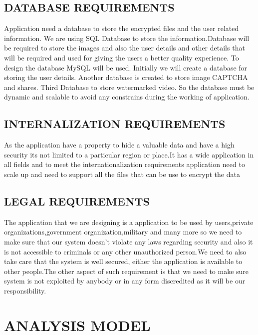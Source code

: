 \documentclass[12pt]{extreport}
\begin{document}
    \subsection{DATABASE REQUIREMENTS}
\hspace*{5em} Application need a database to store the encrypted files and the user related information. We are using SQL Database to store the information.Database will be required to store the images and also the user details and other details that will be required and used for giving the users a better quality experience. To design the database MySQL will be used. Initially we will create a database for storing the user details. Another database is created to store image CAPTCHA and shares. Third Database to store watermarked video. So the database must be dynamic and scalable to avoid any constrains during the working of application.
    \subsection{INTERNALIZATION REQUIREMENTS}
\hspace*{5em}As the application have a property to hide a valuable data and have a high security its not limited to a particular region or place.It has a wide application in all fields and to meet the internationalization requirements application need to scale up and need to support all the files that can be use to encrypt the data
    \subsection{LEGAL REQUIREMENTS}
\hspace*{5em}The application that we are designing is a application to be used by users,private organizations,government organization,military and many more so we need to make sure that our system doesn't violate any laws regarding security and also it is not accessible to criminals or any other unauthorized person.We need to also take care that the system is well secured, either the application is available to other people.The other aspect of such requirement is that we need to make sure system is not exploited by anybody or in any form discredited as it will be our responsibility.

    

\section{ANALYSIS MODEL}
\end{document}
